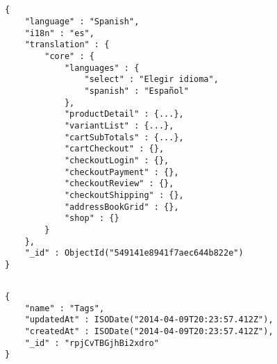 \subsection{\transcollection}

\begin{lstlisting}[caption= Estructura de \transcollection, label=source:javascript:estructura_translations]
{
    "language" : "Spanish",
    "i18n" : "es",
    "translation" : {
        "core" : {
            "languages" : {
                "select" : "Elegir idioma",
                "spanish" : "Español"
            },
            "productDetail" : {...},
            "variantList" : {...},
            "cartSubTotals" : {...},
            "cartCheckout" : {},
            "checkoutLogin" : {},
            "checkoutPayment" : {},
            "checkoutReview" : {},
            "checkoutShipping" : {},
            "addressBookGrid" : {},
            "shop" : {}
        }
    },
    "_id" : ObjectId("549141e8941f7aec644b822e")
}
\end{lstlisting}

\subsection{\tagscollection}

\begin{lstlisting}[caption= Estructura de \tagscollection, label=source:javascript:estructura_tags]
{
    "name" : "Tags",
    "updatedAt" : ISODate("2014-04-09T20:23:57.412Z"),
    "createdAt" : ISODate("2014-04-09T20:23:57.412Z"),
    "_id" : "rpjCvTBGjhBi2xdro"
}
\end{lstlisting}

\subsection{\cartcollection}

\begin{lstlisting}[caption= Estructura de \cartcollection, label=source:javascript:estructura_cart]

\end{lstlisting}

\subsection{\shopscollection}

\begin{lstlisting}[caption= Estructura de \shopscollection, label=source:javascript:estructura_shop]

\end{lstlisting}

\subsection{\ordescollection}

\begin{lstlisting}[caption= Estructura de \ordescollection, label=source:javascript:estructura_order]

\end{lstlisting}